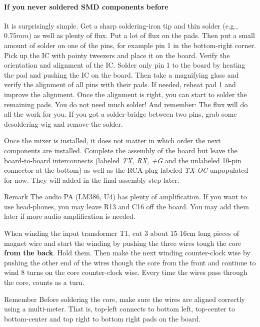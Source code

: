 \documentclass[10pt, a4paper,twoside,openright]{scrartcl}
\newenvironment{remember}{\begin{bclogo}[couleur=blue!30,arrondi=.1,logo=\bccrayon,ombre=true]{Remember}}{\end{bclogo}}
\newenvironment{remark}{\begin{bclogo}[couleur=blue!30,arrondi=.1,logo=\bcinfo,ombre=true]{Remark}}{\end{bclogo}}
\begin{document}
\paragraph{If you never soldered SMD components before} It is surprisingly simple. Get a sharp soldering-iron tip and thin solder (e.g., $0.75mm$) as well as plenty of flux. Put a lot of flux on the pads. Then put a small amount of solder on one of the pins, for example pin 1 in the bottom-right corner. Pick up the IC with pointy tweezers and place it on the board. Verify the orientation and alignment of the IC. Solder only pin 1 to the board by heating the pad and pushing the IC on the board. Then take a magnifying glass and verify the alignment of all pins with their pads. If needed, reheat pad 1 and improve the alignment. Once the alignment is right, you can start to solder the remaining pads. You do not need much solder! And remember: The flux will do all the work for you. If you got a solder-bridge between two pins, grab some desoldering-wig and remove the solder. 

Once the mixer is installed, it does not matter in which order the next components are installed. Complete the assembly of the board but leave the board-to-board interconnects (labeled \emph{TX, RX, +G} and the unlabeled 10-pin connector at the bottom) as well as the RCA plug labeled \emph{TX-OC } unpopulated for now. They will added in the final assembly step later.

\begin{remark}
The audio PA (LM386, U4) has plenty of amplification. If you want to use head-phones, you may leave R13 and C16 off the board. You may add them later if more audio amplification is needed.
\end{remark}

When winding the input transformer T1, cut 3 about 15-16cm long pieces of magnet wire and start the winding by pushing the three wires tough the core \textbf{from the back}. Hold them. Then make the next winding counter-clock wise by pushing the other end of the wires though the core from the front and continue to wind 8 turns on the core counter-clock wise. Every time the wires pass through the core, counts as a turn. 

\begin{remember}
Before soldering the core, make sure the wires are aligned correctly using a multi-meter. That is, top-left connects to bottom left, top-center to bottom-center and top right to bottom right pads on the board. 
\end{remember}
\end{document}
